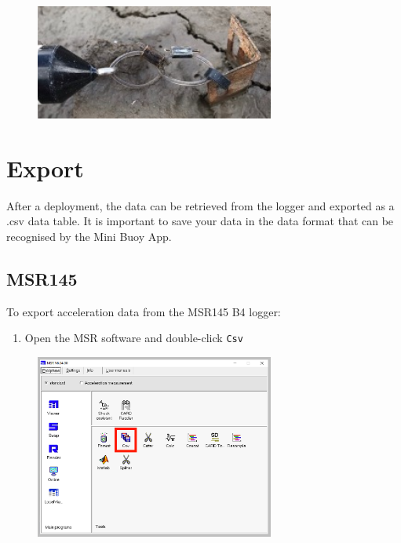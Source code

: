 \documentclass[
  letterpaper,
  DIV=11,
  numbers=noendperiod]{scrreprt}
\providecommand{\tightlist}{%
  \setlength{\itemsep}{0pt}\setlength{\parskip}{0pt}}\usepackage{longtable,booktabs,array}
\begin{document}
\begin{figure}

{\centering \includegraphics[width=0.7\textwidth,height=\textheight]{chapters/figs/MiniBuoyDeployment.jpg}

}

\end{figure}


\hypertarget{sec-export}{%
\chapter{Export}\label{sec-export}}

After a deployment, the data can be retrieved from the logger and
exported as a .csv data table. It is important to save your data in the
data format that can be recognised by the Mini Buoy App.

\hypertarget{msr145-1}{%
\section{MSR145}\label{msr145-1}}

To export acceleration data from the MSR145 B4 logger:

\begin{enumerate}
\def\labelenumi{\arabic{enumi}.}
\tightlist
\item
  Open the MSR software and double-click \texttt{Csv}
\end{enumerate}

\begin{figure}

{\centering \includegraphics[width=0.7\textwidth,height=\textheight]{chapters/figs/MSRExportStep1.png}

}

\end{figure}
\end{document}
